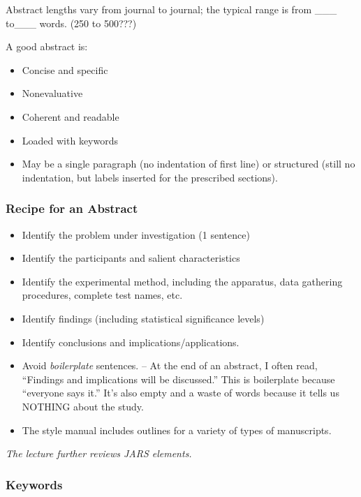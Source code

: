 \documentclass[
  11pt,
]{book}
\providecommand{\tightlist}{%
  \setlength{\itemsep}{0pt}\setlength{\parskip}{0pt}}
\begin{document}
Abstract lengths vary from journal to journal; the typical range is from \_\_\_ to\_\_\_ words. (250 to 500???)

A good abstract is:

\begin{itemize}
\tightlist
\item
  Concise and specific
\item
  Nonevaluative
\item
  Coherent and readable
\item
  Loaded with keywords
\item
  May be a single paragraph (no indentation of first line) or structured (still no indentation, but labels inserted for the prescribed sections).
\end{itemize}

\hypertarget{recipe-for-an-abstract}{%
\subsubsection{Recipe for an Abstract}\label{recipe-for-an-abstract}}

\begin{itemize}
\tightlist
\item
  Identify the problem under investigation (1 sentence)
\item
  Identify the participants and salient characteristics
\item
  Identify the experimental method, including the apparatus, data gathering procedures, complete test names, etc.
\item
  Identify findings (including statistical significance levels)
\item
  Identify conclusions and implications/applications.
\item
  Avoid \emph{boilerplate} sentences.
  -- At the end of an abstract, I often read, ``Findings and implications will be discussed.'' This is boilerplate because ``everyone says it.'' It's also empty and a waste of words because it tells us NOTHING about the study.
\item
  The style manual includes outlines for a variety of types of manuscripts.
\end{itemize}

\emph{The lecture further reviews JARS elements.}

\hypertarget{keywords}{%
\subsubsection{Keywords}\label{keywords}}
\end{document}
